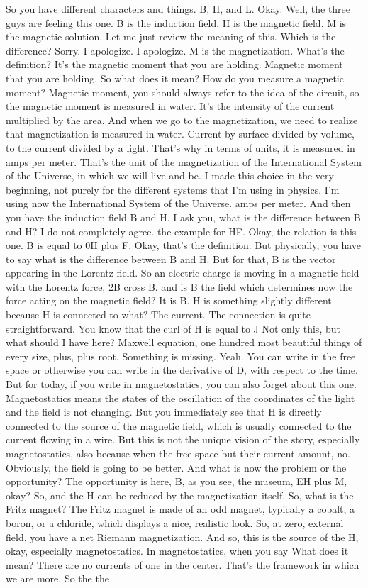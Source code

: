 So you have different characters and things. B, H, and L. Okay. Well, the three guys are feeling this one. B is the induction field. H is the magnetic field. M is the magnetic solution. Let me just review the meaning of this. Which is the difference? Sorry. I apologize. I apologize. M is the magnetization. What's the definition? It's the magnetic moment that you are holding. Magnetic moment that you are holding. So what does it mean? How do you measure a magnetic moment? Magnetic moment, you should always refer to the idea of the circuit, so the magnetic moment is measured in water. It's the intensity of the current multiplied by the area. And when we go to the magnetization, we need to realize that magnetization is measured in water. Current by surface divided by volume, to the current divided by a light. That's why in terms of units, it is measured in amps per meter. That's the unit of the magnetization of the International System of the Universe, in which we will live and be. I made this choice in the very beginning, not purely for the different systems that I'm using in physics. I'm using now the International System of the Universe. amps per meter. And then you have the induction field B and H. I ask you, what is the difference between B and H? I do not completely agree. the example for HF. Okay, the relation is this one. B is equal to 0H plus F. Okay, that's the definition. But physically, you have to say what is the difference between B and H. But for that, B is the vector appearing in the Lorentz field. So an electric charge is moving in a magnetic field with the Lorentz force, 2B cross B. and is B the field which determines now the force acting on the magnetic field? It is B. H is something slightly different because H is connected to what? The current. The connection is quite straightforward. You know that the curl of H is equal to J Not only this, but what should I have here? Maxwell equation, one hundred most beautiful things of every size, plus, plus root. Something is missing. Yeah. You can write in the free space or otherwise you can write in the derivative of D, with respect to the time. But for today, if you write in magnetostatics, you can also forget about this one. Magnetostatics means the states of the oscillation of the coordinates of the light and the field is not changing. But you immediately see that H is directly connected to the source of the magnetic field, which is usually connected to the current flowing in a wire. But this is not the unique vision of the story, especially magnetostatics, also because when the free space but their current amount, no. Obviously, the field is going to be better. And what is now the problem or the opportunity? The opportunity is here, B, as you see, the museum, EH plus M, okay? So, and the H can be reduced by the magnetization itself. So, what is the Fritz magnet? The Fritz magnet is made of an odd magnet, typically a cobalt, a boron, or a chloride, which displays a nice, realistic look. So, at zero, external field, you have a net Riemann magnetization. And so, this is the source of the H, okay, especially magnetostatics. In magnetostatics, when you say What does it mean? There are no currents of one in the center. That's the framework in which we are more. So the the 